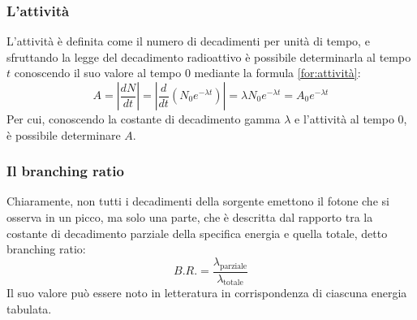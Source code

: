 \documentclass{article}
\begin{document}
            \subsubsection*{L'attività}
                L'attività è definita come il numero di decadimenti per unità di tempo, e sfruttando la legge del decadimento radioattivo è possibile determinarla al tempo $t$ conoscendo il suo valore al tempo $0$ mediante la formula \eqref{for:attività}:
                \begin{equation}\label{for:attività}
                    A=\left|\frac{dN}{dt}\right|=\left|\frac{d}{dt}\left(N_0e^{-\lambda t}\right)\right|=\lambda N_0e^{-\lambda t}=A_0e^{-\lambda t}
                \end{equation}
                Per cui, conoscendo la costante di decadimento gamma $\lambda$ e l'attività al tempo $0$, è possibile determinare $A$.

            \subsubsection*{Il branching ratio}
                Chiaramente, non tutti i decadimenti della sorgente emettono il fotone che si osserva in un picco, ma solo una parte, che è descritta dal rapporto tra la costante di decadimento parziale della specifica energia e quella totale, detto branching ratio:
                \begin{equation*}
                    B.R.=\frac{\lambda_\text{parziale}}{\lambda_\text{totale}}
                \end{equation*}
                Il suo valore può essere noto in letteratura in corrispondenza di ciascuna energia tabulata.
            
\end{document}
